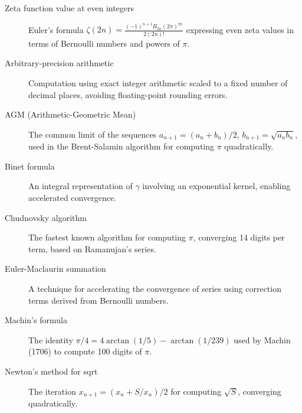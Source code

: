 \begin{description}
\item[Zeta function value at even integers] Euler's formula $\zeta(2n) = \frac{(-1)^{n+1} B_{2n} (2\pi)^{2n}}{2(2n)!}$ expressing even zeta values in terms of Bernoulli numbers and powers of $\pi$.

\item[Arbitrary-precision arithmetic] Computation using exact integer arithmetic scaled to a fixed number of decimal places, avoiding floating-point rounding errors.

\item[AGM (Arithmetic-Geometric Mean)] The common limit of the sequences $a_{n+1} = (a_n+b_n)/2$, $b_{n+1} = \sqrt{a_nb_n}$, used in the Brent-Salamin algorithm for computing $\pi$ quadratically.

\item[Binet formula] An integral representation of $\gamma$ involving an exponential kernel, enabling accelerated convergence.

\item[Chudnovsky algorithm] The fastest known algorithm for computing $\pi$, converging 14 digits per term, based on Ramanujan's series.

\item[Euler-Maclaurin summation] A technique for accelerating the convergence of series using correction terms derived from Bernoulli numbers.

\item[Machin's formula] The identity $\pi/4 = 4\arctan(1/5) - \arctan(1/239)$ used by Machin (1706) to compute 100 digits of $\pi$.

\item[Newton's method for sqrt] The iteration $x_{n+1} = (x_n + S/x_n)/2$ for computing $\sqrt{S}$, converging quadratically.

\end{description}

\cleardoublepage

